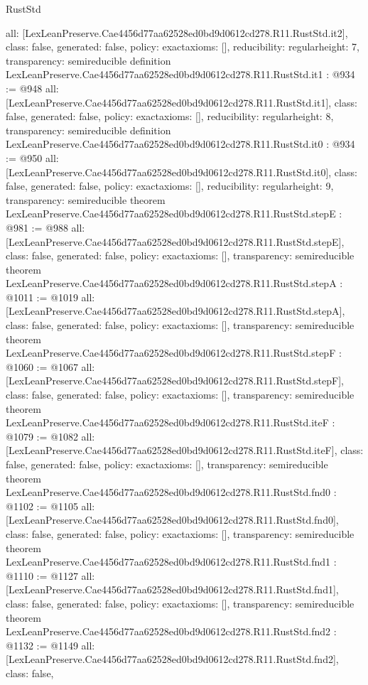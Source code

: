 \begin{lexlean}{RustStd}
\begin{coremodule}
{  all: [LexLeanPreserve.Cae4456d77aa62528ed0bd9d0612cd278.R11.RustStd.it2],
  class: false,
  generated: false,
  policy: exact{axioms: []},
  reducibility: regular{height: 7},
  transparency: semireducible
}
definition LexLeanPreserve.Cae4456d77aa62528ed0bd9d0612cd278.R11.RustStd.it1 : @934 := @948 {
  all: [LexLeanPreserve.Cae4456d77aa62528ed0bd9d0612cd278.R11.RustStd.it1],
  class: false,
  generated: false,
  policy: exact{axioms: []},
  reducibility: regular{height: 8},
  transparency: semireducible
}
definition LexLeanPreserve.Cae4456d77aa62528ed0bd9d0612cd278.R11.RustStd.it0 : @934 := @950 {
  all: [LexLeanPreserve.Cae4456d77aa62528ed0bd9d0612cd278.R11.RustStd.it0],
  class: false,
  generated: false,
  policy: exact{axioms: []},
  reducibility: regular{height: 9},
  transparency: semireducible
}
theorem LexLeanPreserve.Cae4456d77aa62528ed0bd9d0612cd278.R11.RustStd.stepE : @981 := @988 {
  all: [LexLeanPreserve.Cae4456d77aa62528ed0bd9d0612cd278.R11.RustStd.stepE],
  class: false,
  generated: false,
  policy: exact{axioms: []},
  transparency: semireducible
}
theorem LexLeanPreserve.Cae4456d77aa62528ed0bd9d0612cd278.R11.RustStd.stepA : @1011 := @1019 {
  all: [LexLeanPreserve.Cae4456d77aa62528ed0bd9d0612cd278.R11.RustStd.stepA],
  class: false,
  generated: false,
  policy: exact{axioms: []},
  transparency: semireducible
}
theorem LexLeanPreserve.Cae4456d77aa62528ed0bd9d0612cd278.R11.RustStd.stepF : @1060 := @1067 {
  all: [LexLeanPreserve.Cae4456d77aa62528ed0bd9d0612cd278.R11.RustStd.stepF],
  class: false,
  generated: false,
  policy: exact{axioms: []},
  transparency: semireducible
}
theorem LexLeanPreserve.Cae4456d77aa62528ed0bd9d0612cd278.R11.RustStd.iteF : @1079 := @1082 {
  all: [LexLeanPreserve.Cae4456d77aa62528ed0bd9d0612cd278.R11.RustStd.iteF],
  class: false,
  generated: false,
  policy: exact{axioms: []},
  transparency: semireducible
}
theorem LexLeanPreserve.Cae4456d77aa62528ed0bd9d0612cd278.R11.RustStd.fnd0 : @1102 := @1105 {
  all: [LexLeanPreserve.Cae4456d77aa62528ed0bd9d0612cd278.R11.RustStd.fnd0],
  class: false,
  generated: false,
  policy: exact{axioms: []},
  transparency: semireducible
}
theorem LexLeanPreserve.Cae4456d77aa62528ed0bd9d0612cd278.R11.RustStd.fnd1 : @1110 := @1127 {
  all: [LexLeanPreserve.Cae4456d77aa62528ed0bd9d0612cd278.R11.RustStd.fnd1],
  class: false,
  generated: false,
  policy: exact{axioms: []},
  transparency: semireducible
}
theorem LexLeanPreserve.Cae4456d77aa62528ed0bd9d0612cd278.R11.RustStd.fnd2 : @1132 := @1149 {
  all: [LexLeanPreserve.Cae4456d77aa62528ed0bd9d0612cd278.R11.RustStd.fnd2],
  class: false,
}
\end{coremodule}
\end{lexlean}
